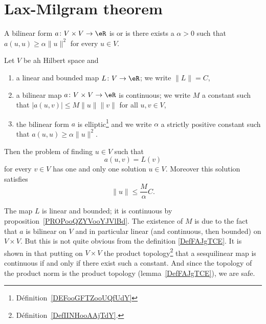 
\section{Lax-Milgram theorem}

\begin{definition}  \label{DEFooGFTZooUQfUdY}
	A bilinear form \( a\colon V\times V\to \eR\) is  or  is there exists a \( \alpha>0\) such that \( a(u,u)\geq \alpha\| u \|^2\) for every \( u\in V\).
\end{definition}

\begin{theorem}       \label{THOooFDJYooCSNnuv}
	Let \( V\) be ah Hilbert space and
	\begin{enumerate}
		\item
		      a linear and bounded map \( L\colon V\to \eR\); we write \( \| L \|=C\),
		\item
		      a bilinear map \( a\colon V\times V\to \eR\) is continuous; we write \( M\) a constant such that \( | a(u,v) |\leq M\| u \|\| v \|\) for all \( u,v\in V\),
		\item
		      the bilinear form \( a\) is elliptic\footnote{Définition~\ref{DEFooGFTZooUQfUdY}} and we write \( \alpha\) a strictly positive constant such that \( a(u,u)\geq \alpha\| u \|^2\).
	\end{enumerate}
	Then the problem of finding \( u\in V\) such that
	\begin{equation}
		a(u,v)=L(v)
	\end{equation}
	for every \( v\in V\) has one and only one solution \( u\in V\). Moreover this solution satisfies
	\begin{equation}
		\| u \|\leq \frac{ M }{ \alpha }C.
	\end{equation}
\end{theorem}
The map \( L\) is linear and bounded; it is continuous by proposition~\ref{PROPooQZYVooYJVlBd}. The existence of \( M\) is due to the fact that \( a\) is bilinear on \( V\) and in particular linear (and continuous, then bounded) on \( V\times V\). But this is not quite obvious from the definition \eqref{DefFAJgTCE}. It is shown in \cite{ooCUHNooNYIeGt} that putting on \( V\times V\) the product topology\footnote{Définition~\ref{DefIINHooAAjTdY}.} that a sesquilinear map is continuous if and only if there exist such a constant. And since the topology of the product norm is the product topology (lemma~\ref{DefFAJgTCE}), we are safe.

